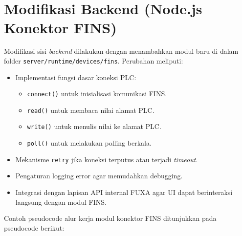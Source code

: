 \section{Modifikasi Backend (Node.js Konektor FINS)}
Modifikasi sisi \textit{backend} dilakukan dengan menambahkan modul baru di dalam folder 
\texttt{server/runtime/devices/fins}. Perubahan meliputi:
\begin{itemize}
    \item Implementasi fungsi dasar koneksi PLC:
    \begin{itemize}
        \item \texttt{connect()} untuk inisialisasi komunikasi FINS.
        \item \texttt{read()} untuk membaca nilai alamat PLC.
        \item \texttt{write()} untuk menulis nilai ke alamat PLC.
        \item \texttt{poll()} untuk melakukan polling berkala.
    \end{itemize}
    \item Mekanisme \texttt{retry} jika koneksi terputus atau terjadi \textit{timeout}.
    \item Pengaturan logging error agar memudahkan debugging.
    \item Integrasi dengan lapisan API internal FUXA agar UI dapat berinteraksi langsung dengan modul FINS.
\end{itemize}
Contoh pseudocode alur kerja modul konektor FINS ditunjukkan pada pseudocode berikut:
